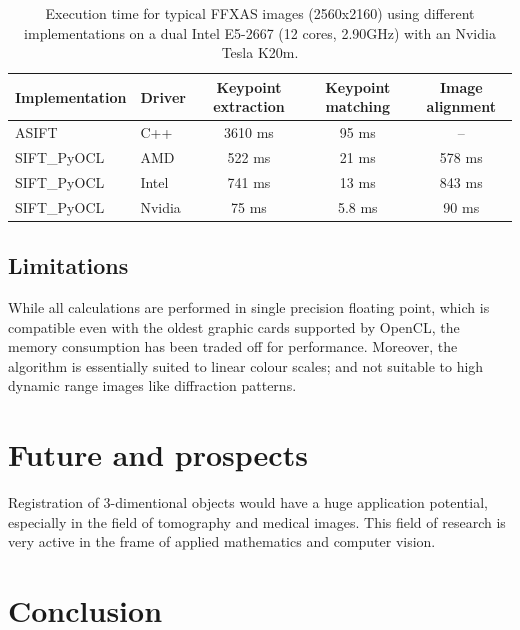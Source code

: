 \documentclass[preprint]{iucr}
\begin{document}
\begin{table}
\caption{Execution time for typical FFXAS images (2560x2160) using different
implementations on a dual Intel E5-2667 (12 cores, 2.90GHz) with an Nvidia Tesla
K20m.}
\label{bench}
\vspace{1mm}
\begin{center}
\begin{tabular}{l l ccc}
Implementation & Driver & Keypoint extraction & Keypoint matching &
Image alignment\\
\hline
ASIFT        &   C++     &   3610 ms  & 95 ms  & --  \\
SIFT\_PyOCL  &   AMD  &   522 ms  &  21 ms&  578 ms \\
SIFT\_PyOCL  &   Intel  &   741 ms  &  13 ms&  843 ms\\
SIFT\_PyOCL  &   Nvidia  &    75 ms  &  5.8 ms & 90 ms\\
\end{tabular}
\end{center}
\end{table}



\subsection{Limitations}
While all calculations are performed in single precision floating point,
which is
compatible even with the oldest graphic cards supported by OpenCL, the
memory consumption has been traded off for performance.
Moreover, the algorithm is essentially suited
to linear colour scales; and  not suitable to high dynamic range
images like diffraction patterns.


\section{Future and prospects}


Registration of 3-dimentional objects would have a huge application potential,
especially in the field of tomography and medical images.
This field of research is very active in the frame of applied mathematics and
computer vision.


\section{Conclusion}
\end{document}
